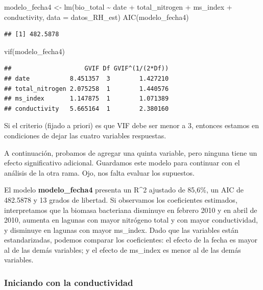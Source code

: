 \documentclass[
]{book}
\newenvironment{Shaded}{\begin{snugshade}}{\end{snugshade}}
\newcommand{\AttributeTok}[1]{\textcolor[rgb]{0.77,0.63,0.00}{#1}}
\newcommand{\FunctionTok}[1]{\textcolor[rgb]{0.00,0.00,0.00}{#1}}
\newcommand{\NormalTok}[1]{#1}
\newcommand{\OtherTok}[1]{\textcolor[rgb]{0.56,0.35,0.01}{#1}}
\newcommand{\SpecialCharTok}[1]{\textcolor[rgb]{0.00,0.00,0.00}{#1}}
\begin{document}
\begin{Shaded}
\begin{Highlighting}[]
\NormalTok{modelo\_fecha4 }\OtherTok{\textless{}{-}} \FunctionTok{lm}\NormalTok{(bio\_total }\SpecialCharTok{\textasciitilde{}}\NormalTok{ date }\SpecialCharTok{+}\NormalTok{ total\_nitrogen }\SpecialCharTok{+}\NormalTok{ ms\_index }\SpecialCharTok{+}\NormalTok{ conductivity, }\AttributeTok{data =}\NormalTok{ datos\_RH\_est)}
\FunctionTok{AIC}\NormalTok{(modelo\_fecha4)}
\end{Highlighting}
\end{Shaded}

\begin{verbatim}
## [1] 482.5878
\end{verbatim}

\begin{Shaded}
\begin{Highlighting}[]
\FunctionTok{vif}\NormalTok{(modelo\_fecha4)}
\end{Highlighting}
\end{Shaded}

\begin{verbatim}
##                    GVIF Df GVIF^(1/(2*Df))
## date           8.451357  3        1.427210
## total_nitrogen 2.075258  1        1.440576
## ms_index       1.147875  1        1.071389
## conductivity   5.665164  1        2.380160
\end{verbatim}

Si el criterio (fijado a priori) es que VIF debe ser menor a 3, entonces estamos en condiciones de dejar las cuatro variables respuestas.

A continuación, probamos de agregar una quinta variable, pero ninguna tiene un efecto significativo adicional. Guardamos este modelo para continuar con el análisis de la otra rama. Ojo, nos falta evaluar los supuestos.

El modelo \textbf{modelo\_fecha4} presenta un R\^{}2 ajustado de 85,6\%, un AIC de 482.5878 y 13 grados de libertad. Si observamos los coeficientes estimados, interpretamos que la biomasa bacteriana disminuye en febrero 2010 y en abril de 2010, aumenta en lagunas con mayor nitrógeno total y con mayor conductividad, y disminuye en lagunas con mayor ms\_index. Dado que las variables están estandarizadas, podemos comparar los coeficientes: el efecto de la fecha es mayor al de las demás variables; y el efecto de ms\_index es menor al de las demás variables.

\hypertarget{iniciando-con-la-conductividad}{%
\subsubsection{Iniciando con la conductividad}\label{iniciando-con-la-conductividad}}
\end{document}
